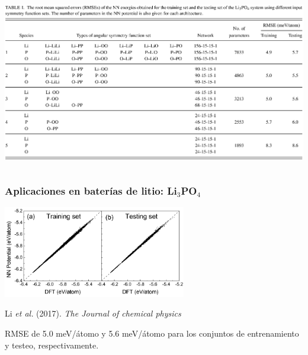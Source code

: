 \documentclass[aspectratio=169]{beamer}
\begin{document}
\begin{frame}
\begin{columns}
            \begin{center}
                \includegraphics[width=0.7\columnwidth]{Li3PO4-rmse.png}
            \end{center}
        \end{columns}

    \end{frame}
    
    \begin{frame}
        \frametitle{Aplicaciones en baterías de litio: Li$_3$PO$_4$}

        \begin{center}
            \includegraphics[width=0.6\textwidth]{Li3PO4-training_testing.png}

            {\tiny Li \textit{et al.} (2017). \textit{The Journal of chemical
            physics}}
        \end{center}

        RMSE de 5.0 meV/átomo y 5.6 meV/átomo para los conjuntos de entrenamiento
        y testeo, respectivamente.

    \end{frame}
\end{document}
